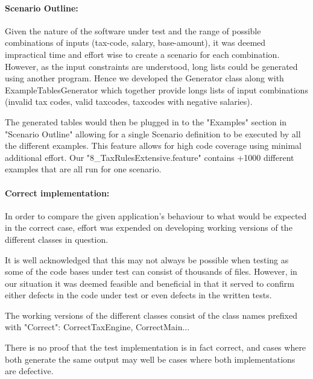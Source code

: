 \paragraph{Scenario Outline:}
Given the nature of the software under test and the range of possible combinations of inputs (tax-code, salary, base-amount), it was deemed impractical time and effort wise to create a scenario for each combination. 
However, as the input constraints are understood, long lists could be generated using another program. Hence we developed the Generator class along with ExampleTablesGenerator which together provide longs lists of input combinations (invalid tax codes, valid taxcodes, taxcodes with negative salaries). 
\par 
The generated tables would then be plugged in to the "Examples" section in "Scenario Outline" allowing for a single Scenario definition to be executed by all the different examples. This feature allows for high code coverage using minimal additional effort. Our "8\_TaxRulesExtensive.feature" contains +1000 different examples that are all run for one scenario. 

\paragraph{Correct implementation:}
In order to compare the given application's behaviour to what would be expected in the correct case, effort was expended on developing working versions of the different classes in question. 
\par 
It is well acknowledged that this may not always be possible when testing as some of the code bases under test can consist of thousands of files. However, in our situation it was deemed feasible and beneficial in that it served to confirm either defects in the code under test or even defects in the written tests. 
\par 
The working versions of the different classes consist of the class names prefixed with "Correct": CorrectTaxEngine, CorrectMain... 
\par 
There is no proof that the test implementation is in fact correct, and cases where both generate the same output may well be cases where both implementations are defective.
